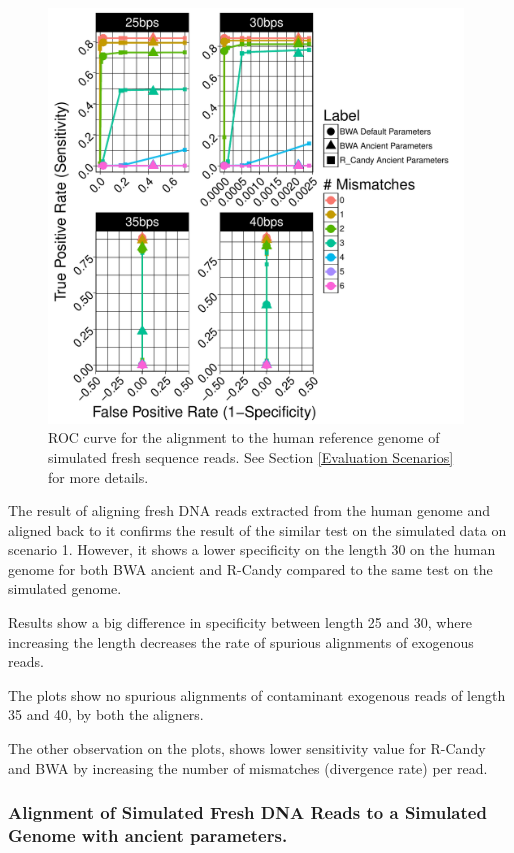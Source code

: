 \documentclass[11pt,a4paper]{report}
\begin{document}
\begin{figure}[H]
\centering
\includegraphics[width=11cm]{pictures/f_DS6_emp.pdf}
\caption{ 
ROC curve for the alignment to the human reference genome of simulated 
fresh sequence reads. See Section \ref{Evaluation Scenarios} 
for more details.
}
\label{DS6_emp}
\end{figure}
 


The result of aligning fresh DNA reads extracted from the human genome
and aligned back to it confirms the result of the similar test on the
simulated data on scenario 1.  However, it shows a lower specificity on
the length 30 on the human genome for both BWA ancient and R-Candy
compared to the same test on the simulated genome.

Results show a big difference in specificity between length 25 and 30, where 
increasing the length decreases the rate of spurious alignments of
exogenous reads.

The plots show no spurious alignments of contaminant exogenous reads of 
length 35 and 40, by both the aligners.

The other observation on the plots, shows lower sensitivity value for R-Candy 
and BWA by increasing the number of  mismatches (divergence rate) per read.


 \subsubsection {Alignment of Simulated Fresh DNA Reads to a Simulated Genome 
 with ancient parameters.}
 \label {Alignment of Simulated Fresh DNA Reads to a Simulated Genome with
 ancient parameters.}
 
\end{document}
